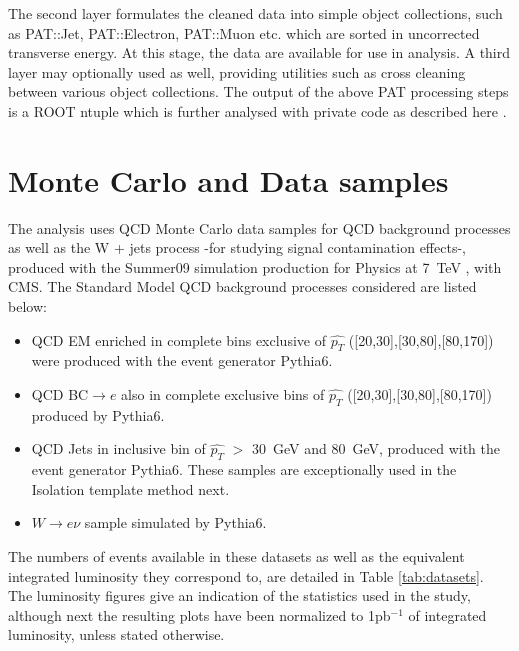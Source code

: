 The second layer formulates the cleaned data into simple object collections, such as PAT::Jet, PAT::Electron, PAT::Muon etc. which are sorted in uncorrected transverse energy.  At this stage, the data are available for use in analysis. A third layer may optionally used as well, providing utilities such as cross cleaning between various object collections. %
The output of the above PAT processing steps is a ROOT ntuple which is further analysed with private code as described here \cite{ICNT}.

\section{Monte Carlo and Data samples}

The analysis uses QCD Monte Carlo data samples for QCD background processes as well as the W + jets process -for studying signal contamination effects-, produced with the Summer09 simulation production for Physics at 7~TeV \cite{data}, with CMS. The Standard Model QCD background processes considered are listed below:
\begin{itemize}
\item QCD EM enriched in complete bins exclusive of $\hat{p_{T}}$  ([20,30],[30,80],[80,170]) were produced with the event generator Pythia6.
\item QCD BC$\rightarrow e$ also in complete exclusive bins of  $\hat{p_{T}}$  ([20,30],[30,80],[80,170]) produced by Pythia6.
\item QCD Jets in inclusive bin of $\hat{p_{T}}$ $>$ 30~GeV and 80~GeV, produced with the event generator Pythia6. These samples are exceptionally used in the Isolation template method next. 
\item $W \rightarrow e\nu$ sample  simulated by Pythia6.
\end{itemize}

The numbers of events available in these datasets as well as the equivalent integrated luminosity they correspond to, are detailed in Table \ref{tab:datasets}. The luminosity figures give an indication of the statistics used in the study, although next the resulting plots have been normalized to 1pb$^{-1}$ of integrated luminosity, unless stated otherwise.

